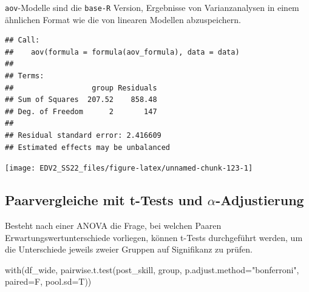 \documentclass[
]{book}
\newenvironment{Shaded}{\begin{snugshade}}{\end{snugshade}}
\newcommand{\AttributeTok}[1]{\textcolor[rgb]{0.77,0.63,0.00}{#1}}
\newcommand{\FunctionTok}[1]{\textcolor[rgb]{0.00,0.00,0.00}{#1}}
\newcommand{\NormalTok}[1]{#1}
\newcommand{\OtherTok}[1]{\textcolor[rgb]{0.56,0.35,0.01}{#1}}
\newcommand{\SpecialCharTok}[1]{\textcolor[rgb]{0.00,0.00,0.00}{#1}}
\newcommand{\StringTok}[1]{\textcolor[rgb]{0.31,0.60,0.02}{#1}}
\begin{document}
\texttt{aov}-Modelle sind die \texttt{base-R} Version, Ergebnisse von Varianzanalysen in einem ähnlichen Format wie die von linearen Modellen abzuspeichern.

\begin{Shaded}
\end{Shaded}

\begin{verbatim}
## Call:
##    aov(formula = formula(aov_formula), data = data)
## 
## Terms:
##                  group Residuals
## Sum of Squares  207.52    858.48
## Deg. of Freedom      2       147
## 
## Residual standard error: 2.416609
## Estimated effects may be unbalanced
\end{verbatim}

\begin{center}\texttt{[image: EDV2\_SS22\_files/figure-latex/unnamed-chunk-123-1]} \end{center}

\hypertarget{paarvergleiche-mit-t-tests-und-alpha-adjustierung}{%
\subsection{\texorpdfstring{Paarvergleiche mit t-Tests und \(\alpha\)-Adjustierung}{Paarvergleiche mit t-Tests und \textbackslash alpha-Adjustierung}}\label{paarvergleiche-mit-t-tests-und-alpha-adjustierung}}

Besteht nach einer ANOVA die Frage, bei welchen Paaren Erwartungswertunterschiede vorliegen, können
t-Tests durchgeführt werden, um die Unterschiede jeweils zweier Gruppen auf Signifikanz zu prüfen.

\begin{Shaded}
\begin{Highlighting}[]
\FunctionTok{with}\NormalTok{(df\_wide, }\FunctionTok{pairwise.t.test}\NormalTok{(post\_skill, group,}
                           \AttributeTok{p.adjust.method=}\StringTok{"bonferroni"}\NormalTok{, }\AttributeTok{paired=}\NormalTok{F, }\AttributeTok{pool.sd=}\NormalTok{T))}
\end{Highlighting}
\end{Shaded}
\end{document}
